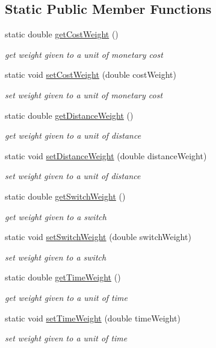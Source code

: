 \subsection*{Static Public Member Functions}
\begin{DoxyCompactItemize}
\item 
static double \hyperlink{class_weight_info_ad567791b90595732893ea16e4abfba84}{get\+Cost\+Weight} ()
\begin{DoxyCompactList}\small\item\em get weight given to a unit of monetary cost \end{DoxyCompactList}\item 
static void \hyperlink{class_weight_info_ad6d08477ecfdcd4120d450a98b6cba12}{set\+Cost\+Weight} (double cost\+Weight)
\begin{DoxyCompactList}\small\item\em set weight given to a unit of monetary cost \end{DoxyCompactList}\item 
static double \hyperlink{class_weight_info_af8544ac25bd9b3502329730eea24e9a8}{get\+Distance\+Weight} ()
\begin{DoxyCompactList}\small\item\em get weight given to a unit of distance \end{DoxyCompactList}\item 
static void \hyperlink{class_weight_info_a11eb3bb70c15776f094c65604a8a0140}{set\+Distance\+Weight} (double distance\+Weight)
\begin{DoxyCompactList}\small\item\em set weight given to a unit of distance \end{DoxyCompactList}\item 
static double \hyperlink{class_weight_info_ae642c6aa8e14eeb72e5abbfc34e6b255}{get\+Switch\+Weight} ()
\begin{DoxyCompactList}\small\item\em get weight given to a switch \end{DoxyCompactList}\item 
static void \hyperlink{class_weight_info_a76c6ab9bfe61f4fe9b1f0124c11eeb17}{set\+Switch\+Weight} (double switch\+Weight)
\begin{DoxyCompactList}\small\item\em set weight given to a switch \end{DoxyCompactList}\item 
static double \hyperlink{class_weight_info_a1a9d3f5ebb45d737a84e55e337360bee}{get\+Time\+Weight} ()
\begin{DoxyCompactList}\small\item\em get weight given to a unit of time \end{DoxyCompactList}\item 
static void \hyperlink{class_weight_info_ad351b068742da448059711d5bdf2b996}{set\+Time\+Weight} (double time\+Weight)
\begin{DoxyCompactList}\small\item\em set weight given to a unit of time \end{DoxyCompactList}\end{DoxyCompactItemize}
